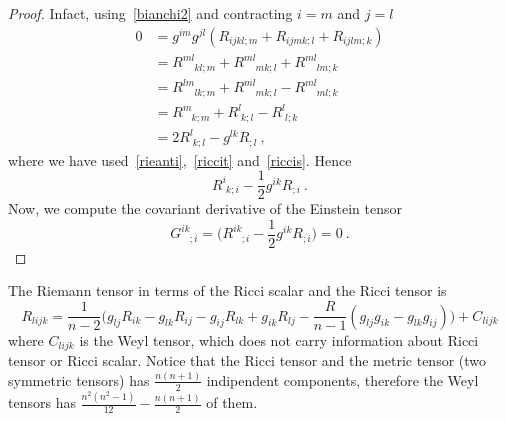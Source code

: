     \begin{proof}
        Infact, using~\eqref{bianchi2} and contracting $i = m$ and $j = l$
        \begin{equation*}
        \begin{aligned}
            0 & = g^{im} g^{jl} (R_{ijkl;m} + R_{ijmk;l} + R_{ijlm;k}) \\ & = R^{ml}_{\phantom{ml} kl;m} + R^{ml}_{\phantom{ml} mk;l} + R^{ml}_{\phantom{ml} lm;k} \\ & = R^{lm}_{\phantom{ml} lk;m} + R^{ml}_{\phantom{ml} mk;l} - R^{ml}_{\phantom{ml} ml;k} \\ & = R^m_{\phantom m k;m} + R^l_{\phantom l k;l} - R^l_{\phantom l l;k} \\ & = 2 R^l_{\phantom l k;l} - g^{lk} R_{;l} ~,
        \end{aligned}
        \end{equation*}
        where we have used~\eqref{rieanti},~\eqref{riccit} and~\eqref{riccis}. Hence 
        \begin{equation*}
            R^i_{\phantom i k;i} - \frac{1}{2} g^{ik} R_{;i} ~.
        \end{equation*}
        Now, we compute the covariant derivative of the Einstein tensor
        \begin{equation*}
            G^{ik}_{\phantom{ik} ;i} = \Big( R^{ik}_{\phantom{ik} ;i} - \frac{1}{2} g^{ik} R_{;i} \Big) = 0 ~.
        \end{equation*}
    \end{proof}
    The Riemann tensor in terms of the Ricci scalar and the Ricci tensor is 
    \begin{equation*}
        R_{lijk} = \frac{1}{n-2} \Big( g_{lj} R_{ik} - g_{lk} R_{ij} - g_{ij} R_{lk} + g_{ik} R_{lj} - \frac{R}{n-1} (g_{lj} g_{ik} - g_{lk} g_{ij}) \Big) + C_{lijk}
    \end{equation*}
    where $C_{lijk}$ is the Weyl tensor, which does not carry information about Ricci tensor or Ricci scalar. Notice that the Ricci tensor and the metric tensor (two symmetric tensors) has $\frac{n(n+1)}{2}$ indipendent components, therefore the Weyl tensors has 
    $\frac{n^2(n^2 - 1)}{12} - \frac{n(n+1)}{2}$ of them.